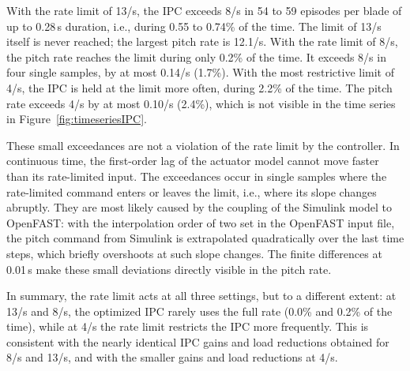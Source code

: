 With the rate limit of 13\textdegree/s, the IPC exceeds 8\textdegree/s in 54 to 59 episodes per blade of up to 0.28\,s duration, i.e., during 0.55 to 0.74\% of the time. The limit of 13\textdegree/s itself is never reached; the largest pitch rate is 12.1\textdegree/s. With the rate limit of 8\textdegree/s, the pitch rate reaches the limit during only 0.2\% of the time. It exceeds 8\textdegree/s in four single samples, by at most 0.14\textdegree/s (1.7\%). With the most restrictive limit of 4\textdegree/s, the IPC is held at the limit more often, during 2.2\% of the time. The pitch rate exceeds 4\textdegree/s by at most 0.10\textdegree/s (2.4\%), which is not visible in the time series in Figure~\ref{fig:timeseriesIPC}.

These small exceedances are not a violation of the rate limit by the controller. In continuous time, the first-order lag of the actuator model cannot move faster than its rate-limited input. The exceedances occur in single samples where the rate-limited command enters or leaves the limit, i.e., where its slope changes abruptly. They are most likely caused by the coupling of the Simulink model to OpenFAST: with the interpolation order of two set in the OpenFAST input file, the pitch command from Simulink is extrapolated quadratically over the last time steps, which briefly overshoots at such slope changes. The finite differences at 0.01\,s make these small deviations directly visible in the pitch rate.

In summary, the rate limit acts at all three settings, but to a different extent: at 13\textdegree/s and 8\textdegree/s, the optimized IPC rarely uses the full rate (0.0\% and 0.2\% of the time), while at 4\textdegree/s the rate limit restricts the IPC more frequently. This is consistent with the nearly identical IPC gains and load reductions obtained for 8\textdegree/s and 13\textdegree/s, and with the smaller gains and load reductions at 4\textdegree/s.
